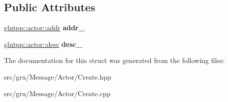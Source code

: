 \subsection*{\-Public \-Attributes}
\begin{DoxyCompactItemize}
\item 
\hypertarget{structglutpp_1_1network_1_1actor_1_1create_ad7ae6922af0930010bd0c78073c7745c}{\hyperlink{classglutpp_1_1actor_1_1addr}{glutpp\-::actor\-::addr} {\bfseries addr\-\_\-}}\label{structglutpp_1_1network_1_1actor_1_1create_ad7ae6922af0930010bd0c78073c7745c}

\item 
\hypertarget{structglutpp_1_1network_1_1actor_1_1create_ae55eea93cbd958365387635335596945}{\hyperlink{classglutpp_1_1actor_1_1desc}{glutpp\-::actor\-::desc} {\bfseries desc\-\_\-}}\label{structglutpp_1_1network_1_1actor_1_1create_ae55eea93cbd958365387635335596945}

\end{DoxyCompactItemize}


\-The documentation for this struct was generated from the following files\-:\begin{DoxyCompactItemize}
\item 
src/gru/\-Message/\-Actor/\-Create.\-hpp\item 
src/gru/\-Message/\-Actor/\-Create.\-cpp\end{DoxyCompactItemize}
